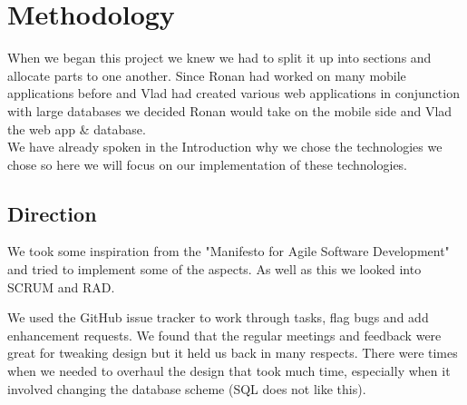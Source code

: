 \chapter{Methodology}	%

When we began this project we knew we had to split it up into sections and allocate parts to one another.  
Since Ronan had worked on many mobile applications before and Vlad had created various web applications in conjunction with large databases we decided Ronan would take on the mobile side and Vlad the web app \& database.
\\

We have already spoken in the Introduction why we chose the technologies we chose so here we will focus on our implementation of these technologies.

\section{Direction}
We took some inspiration from the "Manifesto for Agile Software Development" and tried to implement some of the aspects.
As well as this we looked into SCRUM and RAD.

We used the GitHub issue tracker to work through tasks, flag bugs and add enhancement requests.
We found that the regular meetings and feedback were great for tweaking design but it held us back in many respects.
There were times when we needed to overhaul the design that took much time, especially when it involved changing the database scheme (SQL does not like this).

